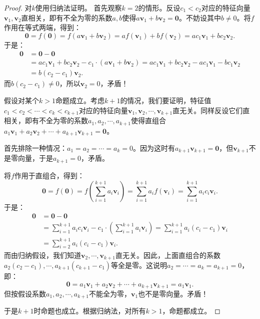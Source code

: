 \documentclass[12pt,UTF8]{ctexbook}
\begin{document}
\begin{proof}
    对$k$使用归纳法证明。
    首先观察$k=2$的情形。反设$c_1<c_2$对应的特征向量$\mathbf{v}_1,\mathbf{v}_2$直相关，即有不全为零的系数$a,b$使得$a\mathbf{v}_1+b\mathbf{v}_2=\mathbf{0}$。不妨设其中$b\neq 0$。将$f$作用在等式两端，得到：
    $$ \mathbf{0} = f(\mathbf{0}) = f(a\mathbf{v}_1+b\mathbf{v}_2) = af(\mathbf{v}_1)+bf(\mathbf{v}_2) = ac_1\mathbf{v}_1+bc_2\mathbf{v}_2.$$
    于是：
    \begin{align*}
        \mathbf{0} &= \mathbf{0} - \mathbf{0} \\
        &= ac_1\mathbf{v}_1+bc_2\mathbf{v}_2 - c_1\cdot(a\mathbf{v}_1+b\mathbf{v}_2) = ac_1\mathbf{v}_1+bc_2\mathbf{v}_2-ac_1\mathbf{v}_1-bc_1\mathbf{v}_2 \\
        &= b(c_2 - c_1)\mathbf{v}_2.
    \end{align*}
    而$b(c_2 - c_1)\neq 0$，所以$\mathbf{v}_2 = 0$，矛盾！

    假设对某个$k>1$命题成立。考虑$k+1$的情况，我们要证明，特征值$c_1<c_2<\cdots<c_k<c_{k+1}$对应的特征向量$\mathbf{v}_1,\mathbf{v}_2,\cdots,\mathbf{v}_{k+1}$直无关。同样反设它们直相关，即有不全为零的系数$a_1,a_2,\cdots,a_{k+1}$使得直组合$a_1\mathbf{v}_1+a_2\mathbf{v}_2+\cdots+a_{k+1}\mathbf{v}_{k+1}=\mathbf{0}$。
    
    首先排除一种情况：$a_1=a_2=\cdots=a_{k}=0$。因为这时有$a_{k+1}\mathbf{v}_{k+1}=\mathbf{0}$，但$\mathbf{v}_{k+1}$不是零向量，于是$a_{k+1}=0$，矛盾。
    
    将$f$作用于直组合，得到：
    $$ \mathbf{0} = f(\mathbf{0}) = f\left(\sum_{i=1}^{k+1} a_i \mathbf{v}_i\right) = \sum_{i=1}^{k+1} a_i f(\mathbf{v}_i) = \sum_{i=1}^{k+1} a_ic_i\mathbf{v}_i.$$
    于是：
    \begin{align*}
        \mathbf{0} &= \mathbf{0} - \mathbf{0} \\
        &= \sum_{i=1}^{k+1} a_ic_i\mathbf{v}_i - c_1\cdot\left( \sum_{i=1}^{k+1} a_i\mathbf{v} _i\right) = \sum_{i=1}^{k+1} a_i(c_i - c_1)\mathbf{v}_i \\
        &= \sum_{i=2}^{k+1} a_i(c_i - c_1)\mathbf{v}_i.
    \end{align*}
    而由归纳假设，我们知道$\mathbf{v}_2,\cdots,\mathbf{v}_{k+1}$直无关。因此，上面直组合的系数$a_2(c_2-c_1),\cdots,a_{k+1}(c_{k+1}-c_1)$等全是零。这说明$a_2=\cdots=a_k=a_{k+1}=0$，即：
    $$\mathbf{0} = a_1\mathbf{v}_1+a_2\mathbf{v}_2+\cdots+a_{k+1}\mathbf{v}_{k+1} = a_1\mathbf{v}_1.$$
    但按假设系数$a_1,a_2,\cdots,a_{k+1}$不能全为零，$\mathbf{v}_1$也不是零向量。矛盾！

    于是$k+1$时命题也成立。根据归纳法，对所有$k>1$，命题都成立。
\end{proof}
\end{document}

